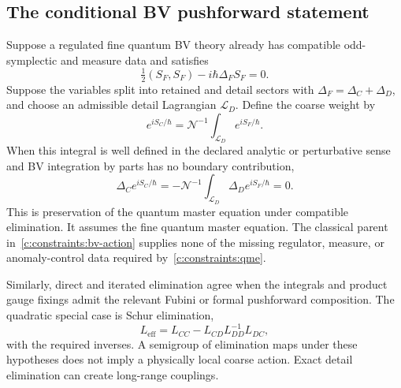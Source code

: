 \subsection{The conditional BV pushforward statement}
Suppose a regulated fine quantum BV theory already has compatible odd-symplectic and measure data and satisfies
\begin{equation}
 \tfrac12(S_F,S_F)-i\hbar\Delta_FS_F=0.
 \label{c:constraints:qme}
\end{equation}
Suppose the variables split into retained and detail sectors with
$\Delta_F=\Delta_C+\Delta_D$, and choose an admissible detail Lagrangian $\mathcal L_D$. Define the coarse weight by
\begin{equation}
 e^{iS_C/\hbar}=\mathcal N^{-1}\int_{\mathcal L_D}e^{iS_F/\hbar}.
\end{equation}
When this integral is well defined in the declared analytic or perturbative sense and BV integration by parts has no boundary contribution,
\begin{equation}
 \Delta_C e^{iS_C/\hbar}
       =-\mathcal N^{-1}\int_{\mathcal L_D}\Delta_D e^{iS_F/\hbar}=0.
\end{equation}
This is preservation of the quantum master equation under compatible elimination. It assumes the fine quantum master equation. The classical parent in~\eqref{c:constraints:bv-action} supplies none of the missing regulator, measure, or anomaly-control data required by~\eqref{c:constraints:qme}.

Similarly, direct and iterated elimination agree when the integrals and product gauge fixings admit the relevant Fubini or formal pushforward composition. The quadratic special case is Schur elimination,
\begin{equation}
 L_{\mathrm{eff}}=L_{CC}-L_{CD}L_{DD}^{-1}L_{DC},
\end{equation}
with the required inverses. A semigroup of elimination maps under these hypotheses does not imply a physically local coarse action. Exact detail elimination can create long-range couplings.

